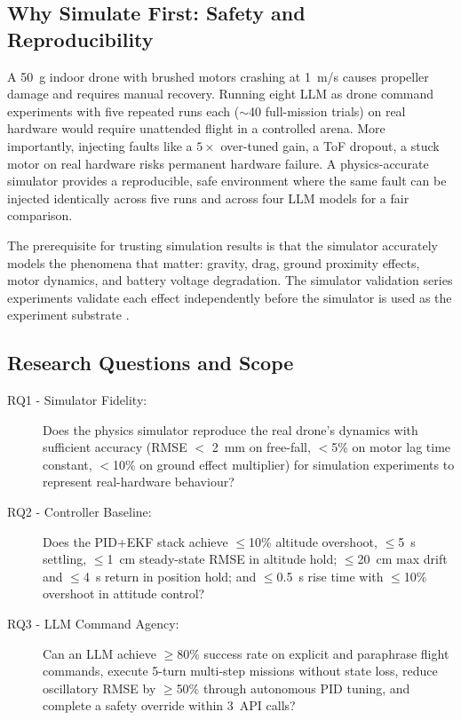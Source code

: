 \subsection{Why Simulate First: Safety and Reproducibility}
\label{sec:ch3_problem_sim}

A 50~g indoor drone with brushed motors crashing at 1~m/s causes propeller
damage and requires manual recovery. 
Running eight LLM as drone command experiments with five repeated runs each ($\sim$40 full-mission trials) on real hardware would require unattended flight in a controlled arena. 
More importantly, injecting faults like a $5\times$ over-tuned gain, a ToF dropout, a stuck motor on real hardware risks permanent hardware failure. 
A physics-accurate simulator provides a reproducible, safe environment where the same fault can be injected identically across five runs and across four LLM models for a fair comparison.

The prerequisite for trusting simulation results is that the simulator accurately models the phenomena that matter: gravity, drag, ground proximity effects, motor dynamics, and battery voltage degradation. 
The simulator validation series experiments validate each effect independently before the simulator is used as the experiment substrate \cite{forster2015crazyflie, faessler2018differential}.

\subsection{Research Questions and Scope}
\label{sec:ch3_problem_rq}

\begin{description}
  \item[RQ1 - Simulator Fidelity:] Does the physics simulator reproduce
    the real drone's dynamics with sufficient accuracy (RMSE $<$ 2~mm on
    free-fall, $<$5\% on motor lag time constant, $<$10\% on ground effect
    multiplier) for simulation experiments to represent real-hardware behaviour?
  \item[RQ2 - Controller Baseline:] Does the PID+EKF stack achieve
    $\leq$10\% altitude overshoot, $\leq$5~s settling, $\leq$1~cm steady-state RMSE in altitude hold; $\leq$20~cm max drift and $\leq$4~s return in position hold; and $\leq$0.5~s rise time with $\leq$10\% overshoot in attitude control?
  \item[RQ3 - LLM Command Agency:] Can an LLM achieve $\geq$80\% success
    rate on explicit and paraphrase flight commands, execute 5-turn multi-step missions without state loss, reduce oscillatory RMSE by $\geq$50\% through autonomous PID tuning, and complete a safety override within 3~API calls?
\end{description}


